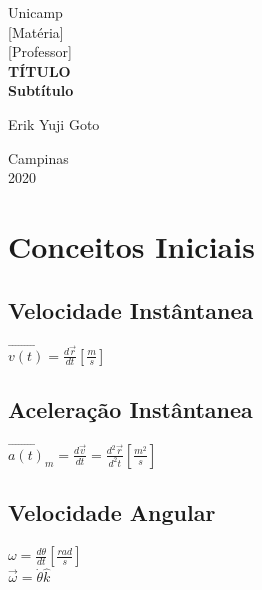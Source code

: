 \documentclass[a4paper, 12pt]{article}
\begin{document}
%
\begin{titlepage} %
	\begin{center} %
		{\large Unicamp}\\[0.2cm] %
		{\large [Matéria]}\\[0.2cm] %
		{\large [Professor]}\\[3.2cm]
		{\bf \huge TÍTULO}\\[0.2cm] 
		{\bf \large Subtítulo}\\[4.9cm]
	\end{center} %
	{\large Erik Yuji Goto}\\[10cm] %
	\begin{center}
	
		{\large Campinas}\\[0.2cm]
		{\large 2020}
	\end{center}
\end{titlepage} %


\tableofcontents
\newpage

\section{Conceitos Iniciais}
	\subsection{Velocidade Instântanea}
		\begin{center}
			\Large			
			$
			\vec{v(t)} = \frac{d\vec{r}}{dt}[\frac{m}{s}]			
			$
		\end{center}
	\subsection{Aceleração Instântanea}
		\begin{center}
			\Large			
			$
			\vec{a(t)}_m = \frac{d\vec{v}}{dt} = \frac{d^2\vec{r}}{d^2t} [\frac{m^2}{s}]			
			$
		\end{center}
	
	\subsection{Velocidade Angular}
		\begin{center}
			\Large			
			$
			\omega = \frac{d\theta}{dt} [\frac{rad}{s}]	
			$\\
			$
			\vec{\omega} = \dot{\theta}\hat{k}
			$			
			
		\end{center}
		
\end{document}

